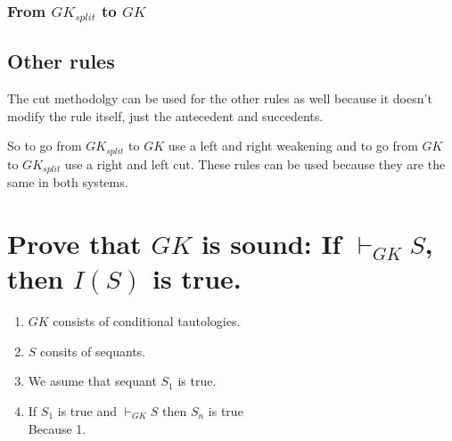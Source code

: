 \documentclass{article}
\begin{document}
\subsubsection{From $GK_{split}$ to $GK$}
\begin{prooftree}
\end{prooftree}
\begin{prooftree}
\end{prooftree}

\subsection{Other rules}
The cut methodolgy can be used for the other rules as well because it doesn't
modify the rule itself, just the antecedent and succedents.

So to go from $GK_{split}$ to $GK$ use a left and right weakening
and to go from $GK$ to $GK_{split}$ use a right and left cut.
These rules can be used because they are the same in both systems.

\section{Prove that $GK$ is sound: If $\vdash_{GK} S$, then $I(S)$ is true.}

\begin{enumerate}
	\item $GK$ consists of conditional tautologies.
	\item $S$ consits of sequants.
	\item We asume that sequant $S_1$ is true.
	\item If $S_1$ is true and $\vdash_{GK} S$ then $S_n$ is true \\
		Because 1.
\end{enumerate}
\end{document}
